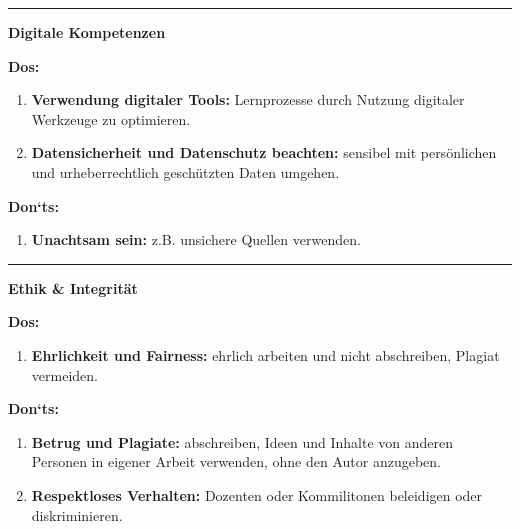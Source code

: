 \documentclass[10pt, oneside]{article}
\begin{document}
\hrule
\vspace{5pt}

\bgroup
\large\textbf{Digitale Kompetenzen}
\egroup

\begin{multicols}{2}

\textbf{Dos:}

\begin{enumerate}[-]
    \item \textbf{Verwendung digitaler Tools:} Lernprozesse durch Nutzung
        digitaler Werkzeuge zu optimieren.
    \item \textbf{Datensicherheit und Datenschutz beachten:} sensibel mit
        persönlichen und urheberrechtlich geschützten Daten umgehen.
\end{enumerate}

\columnbreak

\textbf{Don`ts:}

\begin{enumerate}[-]
    \item \textbf{Unachtsam sein:} z.B. unsichere Quellen verwenden.
\end{enumerate}

\end{multicols}

\vspace{2pt}
\hrule
\vspace{5pt}

\bgroup
\large\textbf{Ethik \& Integrität}
\egroup

\begin{multicols}{2}

\textbf{Dos:}

\begin{enumerate}[-]
    \item \textbf{Ehrlichkeit und Fairness:} ehrlich arbeiten und nicht
        abschreiben, Plagiat vermeiden.
\end{enumerate}

\vfill
\null
\columnbreak

\textbf{Don`ts:}

\begin{enumerate}[-]
    \item \textbf{Betrug und Plagiate:} abschreiben, Ideen und Inhalte von
        anderen Personen in eigener Arbeit verwenden, ohne den Autor anzugeben.
    \item \textbf{Respektloses Verhalten:} Dozenten oder Kommilitonen
        beleidigen oder diskriminieren.
\end{enumerate}

\end{multicols}
\end{document}
